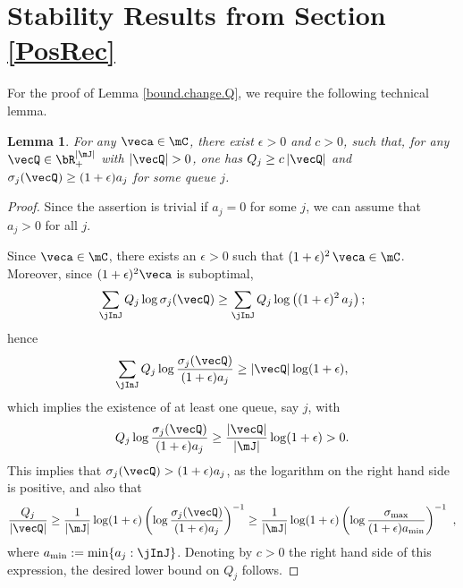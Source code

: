 \documentclass{amsart}
\newtheorem{lemma}{Lemma}
\begin{document}
\section{Stability Results from Section \ref{PosRec}} \label{AppendixD}

For the proof of Lemma \ref{bound.change.Q}, we require the following technical lemma. 

\begin{lemma}\label{lm:lowerbound.q.sigma}
For any $\veca\in\mC$, there exist $\epsilon >0$ and $c>0$, such that, for any $\vecQ\in\bR_+^{|\mJ|}$ with $|\vecQ|>0$, 
 one has $Q_j \geq c \, |\vecQ|$ and $\sigma_j(\vecQ) \ge (1+\epsilon) a_j $ for some queue $j$.
\end{lemma}
\begin{proof}
Since the assertion is trivial if $a_j =0$ for some $j$, we can assume that $a_j >0$ for all $j$.

Since $\veca \in \mC$, there exists an $\epsilon>0$ such that 
$(1+\epsilon)^2 \, \veca \in  \mC$. Moreover, since $(1+\epsilon)^2 \veca$ is  suboptimal, 
\begin{equation*}
\sum_\jInJ Q_j \log\sigma_j(\vecQ) 
\geq \sum_\jInJ Q_j \log \left( (1+\epsilon)^2 \, a_j \right);
\end{equation*}
hence
$$
\sum_\jInJ Q_j \log \frac{\sigma_j(\vecQ)}{(1+\epsilon) a_j} 
\geq |\vecQ|\log (1+\epsilon),
$$
which implies the existence of at least one queue, say $j$, with
$$
Q_j \log \frac{\sigma_j(\vecQ)}{(1+\epsilon) a_j} 
\geq \frac{|\vecQ|}{|\mJ|} \log (1+\epsilon) 
> 0.
$$
This implies that $\sigma_j(\vecQ) > (1+\epsilon) a_j$, as the logarithm on the right hand side is positive, and also that
$$ \frac{Q_j}{|\vecQ|} \geq \frac{1}{|\mJ|}  \log (1+\epsilon) \left(\log \frac{\sigma_j(\vecQ)}{(1+\epsilon) a_j}\right)^{-1} \geq \frac{1}{|\mJ|} \log (1+\epsilon) \left(\log \frac{\sigma_{\max}}{(1+\epsilon) a_{\min}}\right)^{-1} \ , $$
where $a_{\min} := \min \{a_j: \jInJ\}$.
Denoting by $c>0$ the right hand side of this expression, the desired lower bound on $Q_j$ follows.
\end{proof}

\iffalse
\begin{lemma} \label{bound.change.Q}
There exist constants $c, \, K>0$, such that, for $|\vecQ(0)|>0$, some $j\in\mJ$ 
and some time $t < c \, |\vecQ(0)|$
\begin{equation}
   |Q_j(t) - Q_j(0)| \geq K \, |\vecQ(0)|\ .
\end{equation}
\end{lemma}
\fi
\end{document}
